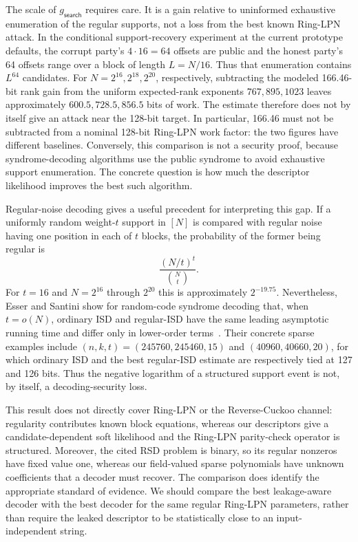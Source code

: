 The scale of $g_{\mathsf{search}}$ requires care.  It is a gain relative to
uninformed exhaustive enumeration of the regular supports, not a loss from the
best known Ring-LPN attack.  In the conditional support-recovery experiment at
the current prototype defaults, the corrupt party's $4\cdot16=64$ offsets are
public and the honest party's 64 offsets range over a block of length
$L=N/16$.  Thus that enumeration contains $L^{64}$ candidates.
For $N=2^{16},2^{18},2^{20}$, respectively, subtracting the modeled 166.46-bit
rank gain from the uniform expected-rank exponents $767,895,1023$ leaves
approximately $600.5,728.5,856.5$ bits of work.  The estimate therefore does
not by itself give an attack near the 128-bit target.  In particular, 166.46
must not be subtracted from a nominal 128-bit Ring-LPN work factor: the two
figures have different baselines.  Conversely, this comparison is not a
security proof, because syndrome-decoding algorithms use the public syndrome
to avoid exhaustive support enumeration.  The concrete question is how much
the descriptor likelihood improves the best such algorithm.

Regular-noise decoding gives a useful precedent for interpreting this gap.
If a uniformly random weight-$t$ support in $[N]$ is compared with regular
noise having one position in each of $t$ blocks, the probability of the former
being regular is
\[
  \frac{(N/t)^t}{\binom Nt}.
\]
For $t=16$ and $N=2^{16}$ through $2^{20}$ this is approximately $2^{-19.75}$.
Nevertheless, Esser and Santini show for random-code syndrome decoding that,
when $t=o(N)$, ordinary ISD and regular-ISD have the same leading asymptotic
running time and differ only in lower-order terms~\cite{regularISD}.  Their
concrete sparse examples include $(n,k,t)=(245760,245460,15)$ and
$(40960,40660,20)$, for which ordinary ISD and the best regular-ISD estimate
are respectively tied at 127 and 126 bits.  Thus the negative logarithm of a
structured support event is not, by itself, a decoding-security loss.

This result does not directly cover Ring-LPN or the Reverse-Cuckoo channel:
regularity contributes known block equations, whereas our descriptors give a
candidate-dependent soft likelihood and the Ring-LPN parity-check operator is
structured.  Moreover, the cited RSD problem is binary, so its regular
nonzeros have fixed value one, whereas our field-valued sparse polynomials have
unknown coefficients that a decoder must recover.  The comparison does
identify the appropriate standard of evidence.  We
should compare the best leakage-aware decoder with the best decoder for the
same regular Ring-LPN parameters, rather than require the leaked descriptor to
be statistically close to an input-independent string.

